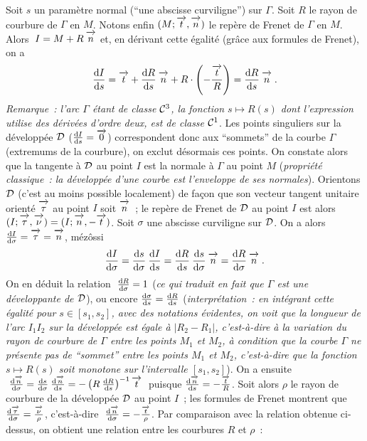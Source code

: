 \documentclass{article}
\begin{document}
\msk
\cl{- - - - - - - - - - - - - - - - - - - - - - - - - - - - - - - }
\msk

Soit $s$ un param\`etre normal (``une abscisse curviligne'') sur $\Gamma$. Soit $R$ le rayon de courbure de $\Gamma$ en $M$. Notons enfin $(M;\vect{t},\vect{n})$ le rep\`ere de Frenet de $\Gamma$ en $M$. Alors $\;I=M+R\>\vect{n}$ et, en d\'erivant cette \'egalit\'e (gr\^ace aux formules de Frenet),  on a\vv
$${{\rm d}I\s{\rm d}s}=\vect{t}+{{\rm d}R\s{\rm d}s}\>\vect{n}+R\cdot\lp-{\vect{t}\s R}\rp={{\rm d}R\s{\rm d}s}\>\vect{n}\;.$$
{\it Remarque~: l'arc $\Gamma$ \'etant de classe ${\cal C}^3$, la fonction $s\mapsto R(s)$ dont l'expression utilise des d\'eriv\'ees d'ordre deux, est de classe ${\cal C}^1$}.\msk
Les points singuliers sur la d\'evelopp\'ee ${\cal D}$ (${{\rm d}I\s{\rm d}s}=\vect{0}$) correspondent donc aux ``sommets'' de la courbe $\Gamma$ (extremums de la courbure), on exclut d\'esormais ces points. On constate alors que la tangente \`a ${\cal D}$ au point $I$ est la normale \`a $\Gamma$ au point $M$ ({\it propri\'et\'e classique~: la d\'evelopp\'ee d'une courbe est l'enveloppe de ses normales}). Orientons ${\cal D}$ (c'est au moins possible localement) de fa\c con que son vecteur tangent unitaire orient\'e $\vect{\tau}$ au point $I$ soit $\vect{n}$~; le rep\`ere de Frenet de ${\cal D}$ au point $I$ est alors $(I;\vect{\tau},\vect{\nu})=(I;\vect{n},-\vect{t})$.\msk
Soit $\sigma$ une abscisse curviligne sur ${\cal D}$. On a alors ${{\rm d}I\s{\rm d}\sigma}=\vect{\tau}=\vect{n}$, m\'ez\^ossi
$${{\rm d}I\s{\rm d}\sigma}={{\rm d}s\s{\rm d}\sigma}\>{{\rm d}I\s{\rm d}s}={{\rm d}R\s{\rm d}s}\>{{\rm d}s\s{\rm d}\sigma}\>\vect{n}={{\rm d}R\s{\rm d}\sigma}\>\vect{n}\;.$$
On en d\'eduit la relation $\;{{\rm d}R\over{\rm d}\sigma}=1$ ({\it ce qui traduit en fait que $\Gamma$ est une d\'eveloppante de ${\cal D}$}), ou encore ${{\rm d}\sigma\over{\rm d}s}={{\rm d}R\over{\rm d}s}$ ({\it interpr\'etation~: en int\'egrant cette \'egalit\'e pour $s\in[s_1,s_2]$, avec des notations \'evidentes, on voit que la longueur de l'arc $I_1I_2$ sur la d\'evelopp\'ee est \'egale \`a $|R_2-R_1|$, c'est-\`a-dire \`a la variation du rayon de courbure de $\Gamma$ entre les points $M_1$ et $M_2$, \`a condition que la courbe $\Gamma$ ne pr\'esente pas de ``sommet'' entre les points $M_1$ et $M_2$, c'est-\`a-dire que la fonction $s\mapsto R(s)$ soit monotone sur l'intervalle $[s_1,s_2]$}).
\msk
On a ensuite $\;{{\rm d}\vect{n}\s{\rm d}\sigma}={{\rm d}s\s{\rm d}\sigma}\>{{\rm d}\vect{n}\s{\rm d}s}=-\lp R\>{{\rm d}R\s{\rm d}s}\rp^{-1}\vect{t}\;$ puisque ${{\rm d}\vect{n}\s{\rm d}s}=-{\vect{t}\s R}$. Soit alors $\rho$ le rayon de courbure de la d\'evelopp\'ee ${\cal D}$ au point $I$~;  les formules de Frenet montrent que ${{\rm d}\vect{\tau}\s{\rm d}\sigma}={\vect{\nu}\s\rho}$, c'est-\`a-dire $\;{{\rm d}\vect{n}\s{\rm d}\sigma}=-{\vect{t}\s\rho}$. Par comparaison avec la relation obtenue ci-dessus, on obtient une relation entre les courbures $R$ et $\rho$~:\vv
\end{document}
